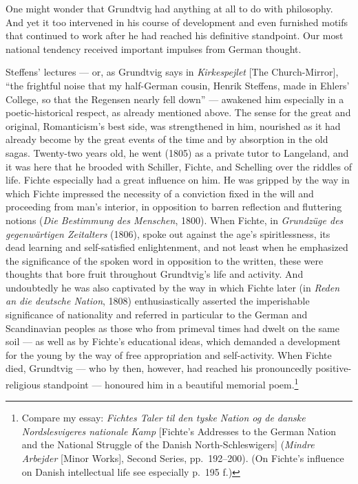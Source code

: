 \documentclass[12pt,a4paper]{book}
\newcommand{\opage}[1]{\marginnote{\footnotesize\textit{[#1]}}}
\begin{document}
One might wonder that Grundtvig had anything at all to do with philosophy. And yet it
too intervened in his course of development and even furnished motifs that continued
to work after he had reached his definitive standpoint. Our most national tendency
received important impulses from German thought.

Steffens' lectures --- or, as Grundtvig says in \emph{Kirkespejlet} [The
Church-Mirror], ``the frightful noise that my half-German cousin, Henrik Steffens,
made in Ehlers' College, so that the Regensen nearly fell down'' --- awakened him
especially in a poetic-historical respect, as already mentioned above. The sense for
the great and original, Romanticism's best side, was strengthened in him, nourished
as it had already become by the great events of the time and by absorption in the \opage{58}old
sagas. Twenty-two years old, he went (1805) as a private tutor to Langeland, and it
was here that he brooded with Schiller, Fichte, and Schelling over the riddles of
life. Fichte especially had a great influence on him. He was gripped by the way in
which Fichte impressed the necessity of a conviction fixed in the will and proceeding
from man's interior, in opposition to barren reflection and fluttering notions
(\emph{Die Bestimmung des Menschen}, 1800). When Fichte, in \emph{Grundzüge des
gegenwärtigen Zeitalters} (1806), spoke out against the age's spiritlessness, its
dead learning and self-satisfied enlightenment, and not least when he emphasized the
significance of the spoken word in opposition to the written, these were thoughts
that bore fruit throughout Grundtvig's life and activity. And undoubtedly he was also
captivated by the way in which Fichte later (in \emph{Reden an die deutsche Nation},
1808) enthusiastically asserted the imperishable significance of nationality and
referred in particular to the German and Scandinavian peoples as those who from
primeval times had dwelt on the same soil --- as well as by Fichte's educational
ideas, which demanded a development for the young by the way of free appropriation and
self-activity. When Fichte died, Grundtvig --- who by then, however, had reached his
pronouncedly positive-religious standpoint --- honoured him in a beautiful memorial
poem.\footnote{Compare my essay: \emph{Fichtes Taler til den tyske Nation og de danske
Nordslesvigeres nationale Kamp} [Fichte's Addresses to the German Nation and the
National Struggle of the Danish North-Schleswigers] (\emph{Mindre Arbejder} [Minor
Works], Second Series, pp.~192--200). (On Fichte's influence on Danish intellectual
life see especially p.~195 f.)}
\end{document}
